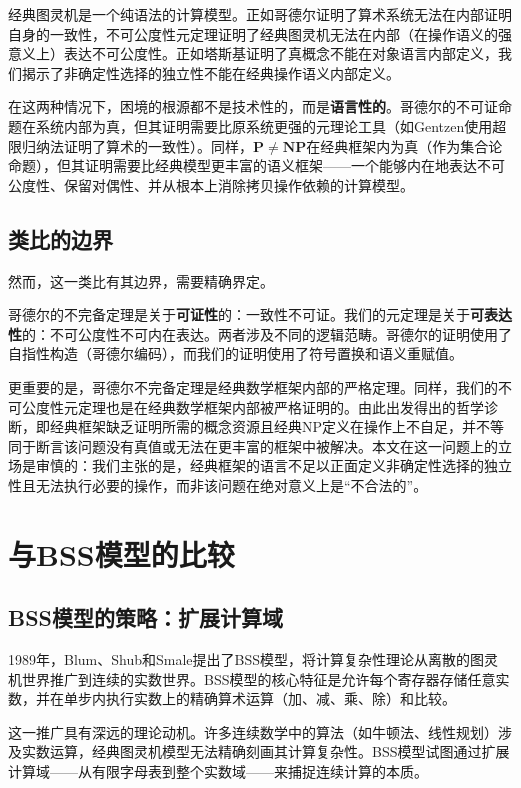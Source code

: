 \documentclass{ctexart}
\begin{document}
	经典图灵机是一个纯语法的计算模型。正如哥德尔证明了算术系统无法在内部证明自身的一致性，不可公度性元定理证明了经典图灵机无法在内部（在操作语义的强意义上）表达不可公度性。正如塔斯基证明了真概念不能在对象语言内部定义，我们揭示了非确定性选择的独立性不能在经典操作语义内部定义。
	
	在这两种情况下，困境的根源都不是技术性的，而是\textbf{语言性的}。哥德尔的不可证命题在系统内部为真，但其证明需要比原系统更强的元理论工具（如Gentzen使用超限归纳法证明了算术的一致性）。同样，$\mathbf{P} \neq \mathbf{NP}$在经典框架内为真（作为集合论命题），但其证明需要比经典模型更丰富的语义框架——一个能够内在地表达不可公度性、保留对偶性、并从根本上消除拷贝操作依赖的计算模型。
	
	\subsection{类比的边界}
	
	然而，这一类比有其边界，需要精确界定。
	
	哥德尔的不完备定理是关于\textbf{可证性}的：一致性不可证。我们的元定理是关于\textbf{可表达性}的：不可公度性不可内在表达。两者涉及不同的逻辑范畴。哥德尔的证明使用了自指性构造（哥德尔编码），而我们的证明使用了符号置换和语义重赋值。
	
	更重要的是，哥德尔不完备定理是经典数学框架内部的严格定理。同样，我们的不可公度性元定理也是在经典数学框架内部被严格证明的。由此出发得出的哲学诊断，即经典框架缺乏证明所需的概念资源且经典NP定义在操作上不自足，并不等同于断言该问题没有真值或无法在更丰富的框架中被解决。本文在这一问题上的立场是审慎的：我们主张的是，经典框架的语言不足以正面定义非确定性选择的独立性且无法执行必要的操作，而非该问题在绝对意义上是``不合法的''。
	
	\section{与BSS模型的比较}
	
	\subsection{BSS模型的策略：扩展计算域}
	
	1989年，Blum、Shub和Smale\cite{Blum1989}提出了BSS模型，将计算复杂性理论从离散的图灵机世界推广到连续的实数世界。BSS模型的核心特征是允许每个寄存器存储任意实数，并在单步内执行实数上的精确算术运算（加、减、乘、除）和比较。
	
	这一推广具有深远的理论动机。许多连续数学中的算法（如牛顿法、线性规划）涉及实数运算，经典图灵机模型无法精确刻画其计算复杂性。BSS模型试图通过扩展计算域——从有限字母表到整个实数域——来捕捉连续计算的本质。
	
\end{document}
